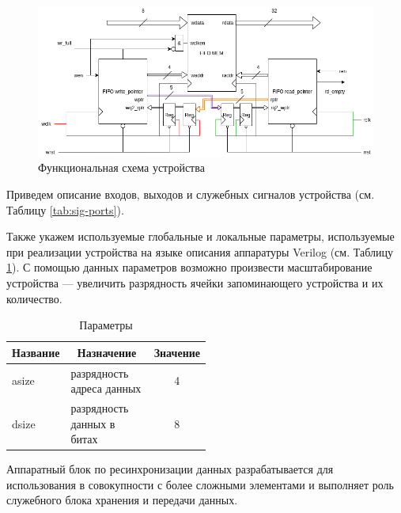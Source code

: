 \begin{figure}[h!]
	\centering
	\includegraphics[width=1\linewidth]{course-scheme/images/unit-design}
	\caption{Функциональная схема устройства}
	\label{fig:unit-design}
\end{figure}


Приведем описание входов, выходов и служебных сигналов устройства (см. Таблицу \ref{tab:sig-ports}).

Также укажем используемые глобальные и локальные параметры, используемые при реализации устройства на языке описания аппаратуры Verilog (см. Таблицу \ref{tab:params}). С помощью данных параметров возможно произвести масштабирование устройства --- увеличить разрядность ячейки запоминающего устройства и их количество.

\begin{table}[htbp]
	\centering
	\fontsize{12}{16pt}\selectfont
	\caption{Параметры}
	\begin{tabular}{|l|p{0.5\linewidth}|c|}
		\hline
		\multicolumn{1}{|c}{\textbf{Название}} & \multicolumn{1}{|c|}{\textbf{Назначение}} & \multicolumn{1}{c|}{\textbf{Значение}} \\ \hline
		asize  &  разрядность адреса данных & 4 \\ \hline
		dsize  &  разрядность данных в битах & 8 \\ \hline
	\end{tabular}
	\label{tab:params}
\end{table}

Аппаратный блок по ресинхронизации данных разрабатывается для использования в совокупности с более сложными элементами и выполняет роль служебного блока хранения и передачи данных.



